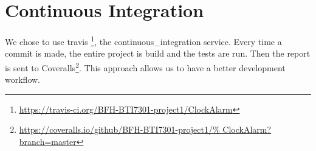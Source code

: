 \section{Continuous Integration}

We chose to use \gls{travis}
\footnote{\url{https://travis-ci.org/BFH-BTI7301-project1/ClockAlarm}}, the
\gls{continuous_integration} service. Every time a commit is made, the entire
project is build and the tests are run. Then the report is sent to
Coveralls\footnote{\url{https://coveralls.io/github/BFH-BTI7301-project1/%
ClockAlarm?branch=master}}. This approach allows us to have a better development
workflow.
